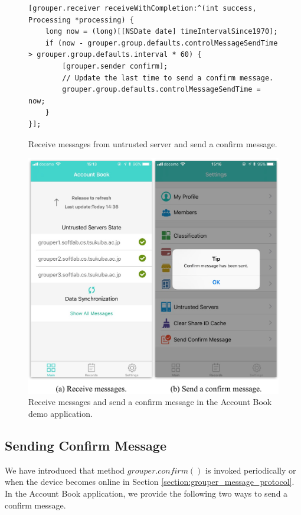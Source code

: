 \documentclass[a4paper,11pt]{report}
\begin{document}
\begin{figure}
\begin{lstlisting}[frame=none language=Objective-C] 
[grouper.receiver receiveWithCompletion:^(int success, Processing *processing) {
    long now = (long)[[NSDate date] timeIntervalSince1970];
    if (now - grouper.group.defaults.controlMessageSendTime > grouper.group.defaults.interval * 60) {
        [grouper.sender confirm];
        // Update the last time to send a confirm message.
        grouper.group.defaults.controlMessageSendTime = now;
    }
}];
\end{lstlisting}
\caption{Receive messages from untrusted server and send a confirm message.}
\label{fig:receive_with_completion}
\end{figure}

\begin{figure}[t]
	\centering
	\includegraphics[scale=0.8]{receive_confirm}
	\caption{Receive messages and send a confirm message in the Account Book demo application.}
	\label{fig:receive_messages_send_confirm}
\end{figure}

\subsection{Sending Confirm Message}

We have introduced that method $grouper.confirm()$ is invoked periodically or when the device becomes online in Section \ref{section:grouper_message_protocol}.
In the Account Book application, we provide the following two ways to send a confirm message.
\end{document}
